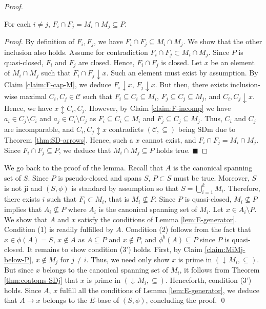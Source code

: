 \documentclass[12pt, a4paper]{article}
\def\arxiv{1}
\newcommand{\cc}[1]{\mathcal{#1}}  %
\newcommand{\U}{S}  %
\DeclareMathOperator{\idl}{\downarrow\!}  %
\DeclareMathOperator{\downp}{\downarrow}  %
\DeclareMathOperator{\dpp}{\updownarrow}  %
\newcommand{\cl}{\phi}  %
\newcommand{\cs}{\cc{C}} %
\newcommand{\imp}{\rightarrow}  %
\begin{document}
\begin{proof}
\begin{claim} \label{claim:MiMj-below-P}
For each $i \neq j$, $F_i \cap F_j = M_i \cap M_j \subseteq P$.
\end{claim}

\begin{proof}
By definition of $F_i, F_j$, we have $F_i \cap F_j \subseteq M_i \cap M_j$.
We show that the other inclusion also holds.
Assume for contradiction $F_i \cap F_j \subset M_i \cap M_j$.
Since $P$ is quasi-closed, $F_i$ and $F_j$ are closed.
Hence, $F_i \cap F_j$ is closed.
Let $x$ be an element of $M_i \cap M_j$ such that $F_i \cap F_j \downp x$.
Such an element must exist by assumption.
By Claim \ref{claim:F-cap-M}, we deduce $F_i \downp x$, $F_j \downp x$.
But then, there exists inclusion-wise maximal $C_i, C_j \in \cs$ such that $F_i \subseteq C_i \subseteq M_i$, $F_j \subseteq C_j \subseteq M_j$, and $C_i, C_j \downp x$.
Hence, we have $x \dpp C_i, C_j$.
However, by Claim \ref{claim:F-incomp} we have $a_i \in C_j \setminus C_i$ and $a_j \in C_i \setminus C_j$ as $F_i \subseteq C_i \subseteq M_i$ and $F_j \subseteq C_j \subseteq M_j$.
Thus, $C_i$ and $C_j$ are incomparable, and $C_i, C_j \dpp x$ contradicts $(\cs, \subseteq)$ being SDm due to Theorem \ref{thm:SD-arrows}.
Hence, such a $x$ cannot exist, and $F_i \cap F_j = M_i \cap M_j$.
Since $F_i \cap F_j \subseteq P$, we deduce that $M_i \cap M_j \subseteq P$ holds true.
\renewcommand{\qed}{$\blacksquare$}
\ifx\arxiv\undefined
\qed
\fi
\end{proof}

We go back to the proof of the lemma.
Recall that $A$ is the canonical spanning set of $\U$.
Since $P$ is pseudo-closed and spans $\U$, $P \subset \U$ must be true.
Moreover, $\U$ is not ji and $(\U, \cl)$ is standard by assumption so that $\U = \bigcup_{i = 1}^k M_i$.
Therefore, there exists $i$ such that $F_i \subset M_i$, that is $M_i \nsubseteq P$.
Since $P$ is quasi-closed, $M_i \nsubseteq P$ implies that $A_i \nsubseteq P$ where $A_i$ is the canonical spanning set of $M_i$.
Let $x \in A_i \setminus P$.
We show that $A$ and $x$ satisfy the conditions of Lemma \ref{lem:E-generator}.
Condition (1) is readily fulfilled by $A$.
Condition (2) follows from the fact that $x \in \cl(A) = \U$, $x \notin A$ as $A \subseteq P$ and $x \notin P$, and $\cl^b(A) \subseteq P$ since $P$ is quasi-closed.
It remains to show condition (3') holds.
First, by Claim \ref{claim:MiMj-below-P}, $x \notin M_j$ for $j \neq i$.
Thus, we need only show $x$ is prime in $(\idl M_i, \subseteq)$.
But since $x$ belongs to the canonical spanning set of $M_i$, it follows from Theorem \ref{thm:coatoms-SDj} that $x$ is prime in $(\idl M_i, \subseteq)$.
Henceforth, condition (3') holds. 
Since $A$, $x$ fulfill all the conditions of Lemma \ref{lem:E-generator}, we deduce that $A \imp x$ belongs to the $E$-base of $(\U, \cl)$, concluding the proof.
\ifx\arxiv\undefined
\qed
\fi
\end{proof}
\end{document}
